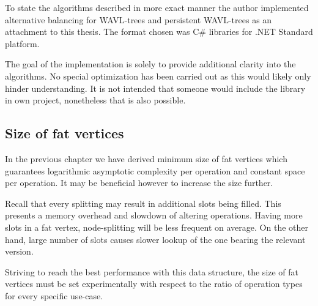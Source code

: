 To state the algorithms described in more exact manner the author implemented alternative balancing for WAVL-trees and persistent WAVL-trees as an attachment to this thesis. The format chosen was C\# libraries for .NET Standard platform.


The goal of the implementation is solely to provide additional clarity into the algorithms. No special optimization has been carried out as this would likely only hinder understanding. It is not intended that someone would include the library in own project, nonetheless that is also possible.


\subsection*{Size of fat vertices}

In the previous chapter we have derived minimum size of fat vertices which guarantees logarithmic asymptotic complexity per operation and constant space per operation. It may be beneficial however to increase the size further.

Recall that every splitting may result in additional slots being filled. This presents a memory overhead and slowdown of altering operations. Having more slots in a fat vertex, node-splitting will be less frequent on average. On the other hand, large number of slots causes slower lookup of the one bearing the relevant version. 

Striving to reach the best performance with this data structure, the size of fat vertices must be set experimentally with respect to the ratio of operation types for every specific use-case.